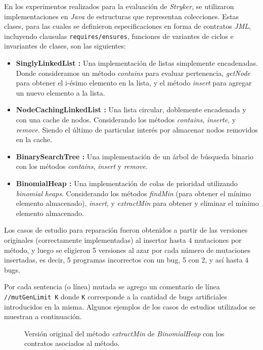 En los experimentos realizados para la evaluaci\'on de \emph{Stryker}, se utilizaron implementaciones en \emph{Java} de estructuras que representan colecciones. Estas clases, para las cuales se definieron especificaciones en forma de contratos \emph{JML}, incluyendo clausulas \texttt{requires/ensures}, funciones de variantes de ciclos e invariantes de clases, son las siguientes:
\begin{itemize}
	\item \textbf{SinglyLinkedList :} Una implementaci\'on de listas simplemente encadenadas. Donde consideramos un m\'etodo \emph{contains} para evaluar pertenencia, \emph{getNode} para obtener el i-\'esimo elemento en la lista, y el m\'etodo \emph{insert} para agregar un nuevo elemento a la lista.
	
	\item \textbf{NodeCachingLinkedList :} Una lista circular, doblemente encadenada y con una cache de nodos. Considerando los m\'etodos \emph{contains}, \emph{inserte}, y \emph{remove}. Siendo el \'ultimo de particular inter\'es por almacenar nodos removidos en la cache.
	
	\item \textbf{BinarySearchTree :} Una implementaci\'on de un \'arbol de b\'usqueda binario con los m\'etodos \emph{contains}, \emph{insert} y \emph{remove}.
	
	\item \textbf{BinomialHeap :} Una implementaci\'on de colas de prioridad utilizando \emph{binomial heaps}. Considerando los m\'etodos \emph{findMin} (para obtener el m\'inimo elemento almacenado), \emph{insert}, y \emph{extractMin} para obtener y eliminar el m\'inimo elemento almacenado.
\end{itemize}

Los casos de estudio para reparaci\'on fueron obtenidos a partir de las versiones originales (correctamente implementadas) al insertar hasta $4$ mutaciones por m\'etodo, y luego se eligieron 5 versiones al azar por cada n\'umero de mutaciones insertadas, es decir, 5 programas incorrectos con un bug, 5 con 2, y as\'i hasta $4$ bugs.

Por cada sentencia (o l\'inea) mutada se agrego un comentario de l\'inea \texttt{//mutGenLimit K} donde \texttt{K} corresponde a la cantidad de bugs artificiales introducidos en la misma. Algunos ejemplos de los casos de estudios utilizados se muestran a continuaci\'on.

\begin{figure}
	
	\caption{Versi\'on original del m\'etodo \emph{extractMin} de \emph{BinomialHeap} con los contratos asociados al m\'etodo.}
	\label{figures.code.repair.binheap_extractMin_orig}
\end{figure}

